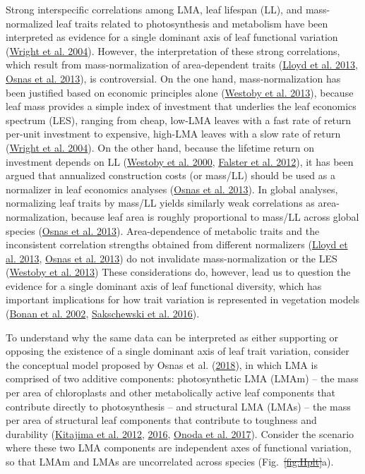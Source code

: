 \documentclass[
  12pt,
  a4paper,
,tablecaptionabove
]{scrartcl}
\providecommand{\DIFaddtex}[1]{{\protect\color{blue}\uwave{#1}}} %
\providecommand{\DIFdeltex}[1]{{\protect\color{red}\sout{#1}}}                      %
\providecommand{\DIFaddbegin}{} %
\providecommand{\DIFaddend}{} %
\providecommand{\DIFdelbegin}{} %
\providecommand{\DIFdelend}{} %
\providecommand{\DIFadd}[1]{\texorpdfstring{\DIFaddtex{#1}}{#1}} %
\providecommand{\DIFdel}[1]{\texorpdfstring{\DIFdeltex{#1}}{}} %
\newcommand{\DIFscaledelfig}{0.5}
\newlength{\DIFdelgraphicswidth} %
\newlength{\DIFdelgraphicsheight} %
\newcommand{\DIFaddincludegraphics}[2][]{{\color{blue}\fbox{\DIFOincludegraphics[#1]{#2}}}} %
\newcommand{\DIFdelincludegraphics}[2][]{%
\sbox{\DIFdelgraphicsbox}{\DIFOincludegraphics[#1]{#2}}%
\settoboxwidth{\DIFdelgraphicswidth}{\DIFdelgraphicsbox} %
\settoboxtotalheight{\DIFdelgraphicsheight}{\DIFdelgraphicsbox} %
\scalebox{\DIFscaledelfig}{%
\parbox[b]{\DIFdelgraphicswidth}{\usebox{\DIFdelgraphicsbox}\\[-\baselineskip] \rule{\DIFdelgraphicswidth}{0em}}\llap{\resizebox{\DIFdelgraphicswidth}{\DIFdelgraphicsheight}{%
\setlength{\unitlength}{\DIFdelgraphicswidth}%
\begin{picture}(1,1)%
\thicklines\linethickness{2pt} %
{\color[rgb]{1,0,0}\put(0,0){\framebox(1,1){}}}%
{\color[rgb]{1,0,0}\put(0,0){\line( 1,1){1}}}%
{\color[rgb]{1,0,0}\put(0,1){\line(1,-1){1}}}%
\end{picture}%
}\hspace*{3pt}}} %
} %
\DeclareRobustCommand{\DIFaddbegin}{\DIFOaddbegin \let\includegraphics\DIFaddincludegraphics} %
\DeclareRobustCommand{\DIFaddend}{\DIFOaddend \let\includegraphics\DIFOincludegraphics} %
\DeclareRobustCommand{\DIFdelbegin}{\DIFOdelbegin \let\includegraphics\DIFdelincludegraphics} %
\DeclareRobustCommand{\DIFdelend}{\DIFOaddend \let\includegraphics\DIFOincludegraphics} %
\begin{document}
Strong interspecific correlations among LMA, leaf lifespan (LL), and
mass-normalized leaf traits related to photosynthesis and metabolism
have been interpreted as evidence for a single dominant axis of leaf
functional variation (\protect\hyperlink{ref-Wright2004a}{Wright et al.
2004}). However, the interpretation of these strong correlations, which
result from mass-normalization of area-dependent traits
(\protect\hyperlink{ref-Lloyd2013}{Lloyd et al. 2013},
\protect\hyperlink{ref-Osnas2013}{Osnas et al. 2013}), is controversial.
On the one hand, mass-normalization has been justified based on economic
principles alone (\protect\hyperlink{ref-Westoby2013}{Westoby et al.
2013}), because leaf mass provides a simple index of investment that
underlies the leaf economics spectrum (LES), ranging from cheap, low-LMA
leaves with a fast rate of return per-unit investment to expensive,
high-LMA leaves with a slow rate of return
(\protect\hyperlink{ref-Wright2004a}{Wright et al. 2004}). On the other
hand, because the lifetime return on investment depends on LL
(\protect\hyperlink{ref-Westoby2000}{Westoby et al. 2000},
\protect\hyperlink{ref-Falster2012}{Falster et al. 2012}), it has been
argued that annualized construction costs (or mass/LL) should be used as
a normalizer in leaf economics analyses
(\protect\hyperlink{ref-Osnas2013}{Osnas et al. 2013}). In global
analyses, normalizing leaf traits by mass/LL yields similarly weak
correlations as area-normalization, because leaf area is roughly
proportional to mass/LL across global species
(\protect\hyperlink{ref-Osnas2013}{Osnas et al. 2013}). Area-dependence
of metabolic traits and the inconsistent correlation strengths obtained
from different normalizers (\protect\hyperlink{ref-Lloyd2013}{Lloyd et
al. 2013}, \protect\hyperlink{ref-Osnas2013}{Osnas et al. 2013}) do not
invalidate mass-normalization or the LES
(\protect\hyperlink{ref-Westoby2013}{Westoby et al. 2013}) These
considerations do, however, lead us to question the evidence for a
single dominant axis of leaf functional diversity, which has important
implications for how trait variation is represented in vegetation models
(\protect\hyperlink{ref-Bonan2002}{Bonan et al. 2002},
\protect\hyperlink{ref-Sakschewski2016}{Sakschewski et al. 2016}).

To understand why the same data can be interpreted as either supporting
or opposing the existence of a single dominant axis of leaf trait
variation, consider the conceptual model proposed by Osnas et al.
(\protect\hyperlink{ref-Osnas2018}{2018}), in which LMA is comprised of
two additive components: photosynthetic LMA (LMAm) -- the mass per area
of chloroplasts and other metabolically active leaf components that
contribute directly to photosynthesis -- and structural LMA (LMAs) --
the mass per area of structural leaf components that contribute to
toughness and durability (\protect\hyperlink{ref-Kitajima2012}{Kitajima
et al. 2012}, \protect\hyperlink{ref-Kitajima2016}{2016},
\protect\hyperlink{ref-Onoda2017}{Onoda et al. 2017}). Consider the
scenario where these two LMA components are independent axes of
functional variation, so that LMAm and LMAs are uncorrelated across
species (Fig.~\DIFdelbegin \DIFdel{\ref{fig:Hplt}}\DIFdelend \DIFaddbegin \DIFadd{\ref{fig-Hplt}}\DIFaddend a).
\DIFaddbegin
\end{document}
